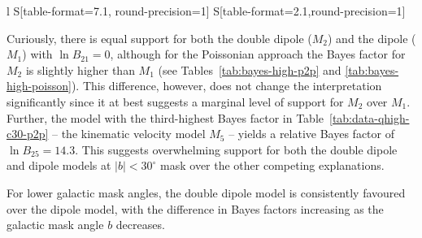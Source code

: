 \documentclass[fleqn,usenatbib]{mnras}
\begin{document}
\begin{table}
\begin{tabular}{l S[table-format=7.1, round-precision=1] S[table-format=2.1,round-precision=1]}
                 \end{tabular}
            \caption{Table of Bayes factors by model for a $30^\circ$ mask with the Quaia high sample and using the point-by-point approach. The highlighted cell represents the model with the highest Bayes factor, indicating it has the strongest level of support.}
            \label{tab:data-qhigh-c30-p2p}
            \end{table}
            Curiously, there is equal support for both the double dipole ($M_2$) and the dipole ($M_1$) with $\ln B_{21} = 0$, although for the Poissonian approach the Bayes factor for $M_2$ is slightly higher than $M_1$ (see Tables~\ref{tab:bayes-high-p2p} and \ref{tab:bayes-high-poisson}).
            This difference, however, does not change the interpretation significantly since it at best suggests a marginal level of support for $M_2$ over $M_1$. 
            Further, the model with the third-highest Bayes factor in Table~\ref{tab:data-qhigh-c30-p2p} -- the kinematic velocity model $M_5$ -- yields a relative Bayes factor of $\ln B_{25} = 14.3$.
            This suggests overwhelming support for both the double dipole and dipole models at $|b| < 30^\circ $ mask over the other competing explanations.
            
            For lower galactic mask angles, the double dipole model is consistently favoured over the dipole model, with the difference in Bayes factors increasing as the galactic mask angle $b$ decreases.
\end{document}
